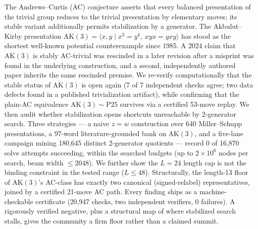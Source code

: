 The Andrews--Curtis (AC) conjecture asserts that every balanced presentation of the
trivial group reduces to the trivial presentation by elementary moves; its stable
variant additionally permits stabilization by a generator. The Akbulut--Kirby
presentation $\mathrm{AK}(3) = \langle x,y \mid x^{3}=y^{4},\ xyx=yxy\rangle$ has stood
as the shortest well-known potential counterexample since 1985. A 2024 claim that
$\mathrm{AK}(3)$ is stably AC-trivial was rescinded in a later revision after a misprint
was found in the underlying construction, and a second, independently authored paper
inherits the same rescinded premise. We re-verify computationally that the stable status
of $\mathrm{AK}(3)$ is open again (7 of 7 independent checks agree; two data defects
found in a published trivialization artifact), while confirming that the plain-AC
equivalence $\mathrm{AK}(3)\sim\mathrm{P}25$ survives via a certified 53-move replay. We
then audit whether stabilization opens shortcuts unreachable by 2-generator search. Three
strategies --- a naive $z=w$ construction over 640 Miller--Schupp presentations, a 97-word
literature-grounded bank on $\mathrm{AK}(3)$, and a five-lane campaign mining 180{,}645
distinct 2-generator quotients --- record 0 of 16{,}870 solve attempts succeeding, within
the searched budgets (up to $2\times10^{6}$ nodes per search, beam width $\le 2048$). We further
show the $L=24$ length cap is not the binding constraint in the tested range ($L\le 48$).
Structurally, the length-13 floor of $\mathrm{AK}(3)$'s AC-class has exactly two canonical
(signed-relabel) representatives, joined by a certified 21-move AC path. Every finding
ships as a machine-checkable certificate (20{,}947 checks, two independent verifiers, 0
failures). A rigorously verified negative, plus a structural map of where stabilized
search stalls, gives the community a firm floor rather than a claimed summit.
